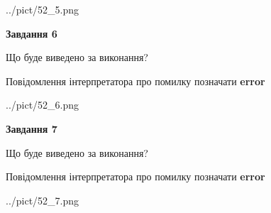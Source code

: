 \documentclass[10pt, ukrainian]{article}
\begin{document}
{\begin {large}
\begin{center}
	{../pict/52_5.png}
\end{center}
\newpage

{\begin {center}\textbf{Завдання 6}\end {center}}\par
Що буде виведено за виконання? \par
Повідомлення інтерпретатора про помилку позначати \textbf{error}

\begin{center}
	{../pict/52_6.png}
\end{center}
\newpage

{\begin {center}\textbf{Завдання 7}\end {center}}\par
Що буде виведено за виконання? \par
Повідомлення інтерпретатора про помилку позначати \textbf{error}

\begin{center}
	{../pict/52_7.png}
\end{center}
\newpage

\end {large}}
\end{document}
